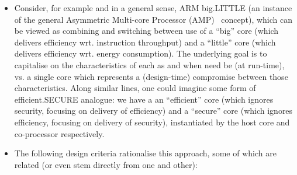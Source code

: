 \begin{itemize}
\item Consider, for example and in a general sense, ARM {\sf big.LITTLE}
      (an instance of the general Asymmetric Multi-core Processor (AMP)~\cite{SCARV:Mittal:16} concept),
      which can be viewed as combining and switching between
      use of
      a ``big''    core (which delivers efficiency wrt. instruction throughput)
      and 
      a ``little'' core (which delivers efficiency wrt. energy consumption).
      The underlying goal is to capitalise on the characteristics of each as 
      and when need be (at run-time), vs. a single core which represents a 
      (design-time) compromise between those characteristics.  Along similar 
      lines, one could imagine some form of {\sf efficient.SECURE} analogue: 
      we have a 
      an ``efficient'' core (which ignores   security, focusing on delivery of efficiency)
      and
      a  ``secure''    core (which ignores efficiency, focusing on delivery of   security),
      instantiated by the host core and \XCID co-processor respectively.

\item The following design criteria rationalise this approach, some of which
      are related (or even stem directly from one and other):


\end{itemize}
